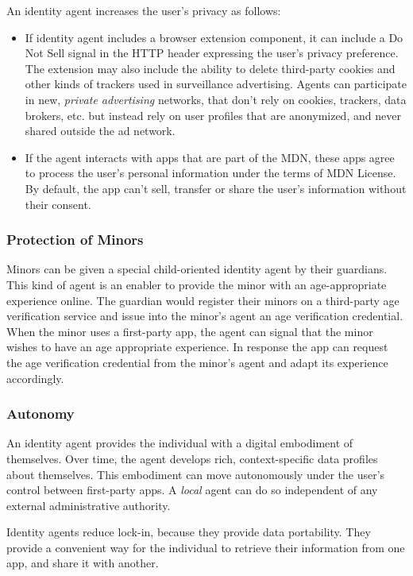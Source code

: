 \documentclass[11pt, oneside]{article}   	%
\begin{document}
An identity agent increases the user's privacy as follows:
\begin{itemize}
	\item If identity agent includes a browser extension component, it can include a Do Not Sell signal in the HTTP header expressing the user's privacy preference. The extension may also include the ability to delete third-party cookies and other kinds of trackers used in surveillance advertising. Agents can participate in new, \emph{private advertising} networks, that don't rely on cookies, trackers, data brokers, etc. but instead rely on user profiles that are anonymized, and never shared outside the ad network. 
	\item If the agent interacts with apps that are part of the MDN, these apps agree to process the user's personal information under the terms of MDN License. By default, the app can't sell, transfer or share the user's information without their consent. 
\end{itemize}

\subsubsection{Protection of Minors}

Minors can be given a special child-oriented identity agent by their guardians. This kind of agent is an enabler to  provide the minor with an age-appropriate experience online. The guardian would register their minors on a third-party age verification service and issue into the minor's agent an age verification credential. When the minor uses a first-party app, the agent can signal that the minor wishes to have an age appropriate experience. In response the app can request the age verification credential from the minor's agent and adapt its experience accordingly.

\subsubsection{Autonomy}

An identity agent provides the individual with a digital embodiment of themselves. Over time, the agent develops rich, context-specific data profiles about themselves. This embodiment can move autonomously under the user's control between first-party apps. A \emph{local} agent can do so independent of any external administrative authority. 

Identity agents reduce lock-in, because they provide data portability. They provide a convenient way for the individual to retrieve their information from one app, and share it with another. 
\end{document}
